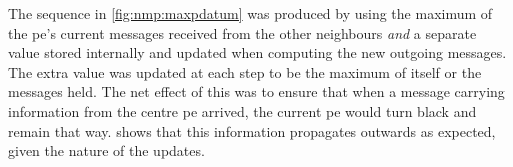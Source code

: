 The sequence in \cref{fig:nmp:maxpdatum} was produced by using the maximum of the \gls{pe}'s current messages received from the other neighbours \emph{and} a separate value stored internally and updated when computing the new outgoing messages.  The extra value was updated at each step to be the maximum of itself or the messages held.  The net effect of this was to ensure that when a message carrying information from the centre \gls{pe} arrived, the current \gls{pe} would turn black and remain that way.   shows that this information propagates outwards as expected, given the nature of the updates.

\begin{figure}
    \centering

\end{figure}
